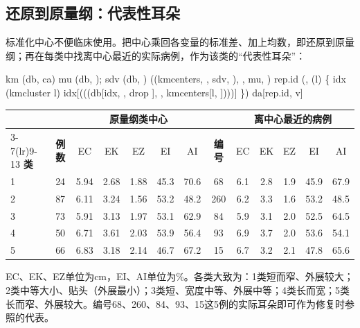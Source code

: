 \subsection{还原到原量纲：代表性耳朵}
标准化中心不便临床使用。把中心乘回各变量的标准差、加上均数，即还原到原量纲；再在每类中找离中心最近的实际病例，作为该类的“代表性耳朵”：
\begin{code}
km \ROperator{<-} (db, ca)
mu \ROperator{<-} (db, ); sdv \ROperator{<-} (db, )
((km\ROperator{\$}centers, , sdv, ), , mu, )   
rep.id \ROperator{<-} (\ROperator{:}, (l) \{
  idx \ROperator{<-} (km\ROperator{\$}cluster \ROperator{==} l)
  idx[(((db[idx, , drop \ROperator{=} ], , km\ROperator{\$}centers[l, ])\ROperator{\textasciicircum{}}))]
\})
da[rep.id, v]
\end{code}
\begin{center}\small\begin{tabular}{lcccccccccccc}\toprule
&&\multicolumn{5}{c}{\bfseries 原量纲类中心}&&\multicolumn{5}{c}{\bfseries 离中心最近的病例}\\\cmidrule(lr){3-7}\cmidrule(lr){9-13}
{\bfseries 类}&{\bfseries 例数}&EC&EK&EZ&EI&AI&{\bfseries 编号}&EC&EK&EZ&EI&AI\\\midrule
1&24&5.94&2.68&1.88&45.3&70.6&68&6.1&2.8&1.9&45.9&67.9\\
2&87&6.11&3.24&1.56&53.2&48.2&260&6.2&3.3&1.6&53.2&48.5\\
3&73&5.91&3.13&1.97&53.1&62.9&84&5.9&3.1&2.0&52.5&64.5\\
4&50&6.71&3.61&2.03&53.9&56.4&93&6.9&3.7&2.0&53.6&54.1\\
5&66&6.83&3.18&2.14&46.7&67.2&15&6.7&3.2&2.1&47.8&65.6\\\bottomrule
\end{tabular}\end{center}
EC、EK、EZ单位为cm，EI、AI单位为\%。各类大致为：1类短而窄、外展较大；2类中等大小、贴头（外展最小）；3类短、宽度中等、外展中等；4类长而宽；5类长而窄、外展较大。编号68、260、84、93、15这5例的实际耳朵即可作为修复时参照的代表。
